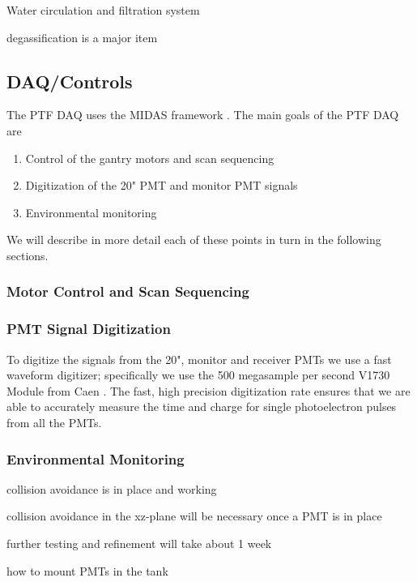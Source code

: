 Water circulation and filtration system

degassification is a major item


\subsection{DAQ/Controls}
\label{Sec:DAQ_Controls}

The PTF DAQ uses the MIDAS framework \cite{MIDASRef}.  The main goals of the PTF DAQ are

\begin{enumerate}
\item Control of the gantry motors and scan sequencing
\item Digitization of the 20" PMT and monitor PMT signals 
\item Environmental monitoring
\end{enumerate}

We will describe in more detail each of these points in turn in the following sections.

\subsubsection{Motor Control and Scan Sequencing}


\subsubsection{PMT Signal Digitization}

To digitize the signals from the 20", monitor and receiver PMTs we use a fast waveform digitizer; specifically
we use the 500 megasample per second V1730 Module from Caen \cite{V1730Ref}.  The fast, high precision digitization rate ensures that we
are able to accurately measure the time and charge for single photoelectron pulses from all the PMTs.


\subsubsection{Environmental Monitoring}




collision avoidance is in place and working

collision avoidance in the xz-plane will be necessary once a PMT is in place

further testing and refinement will take about 1 week

how to mount PMTs in the tank




